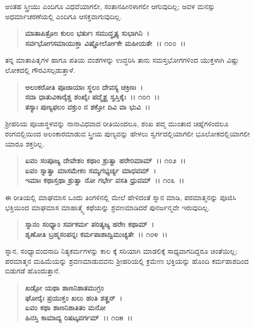 ಅಂತಹ ಸ್ತ್ರೀಯು ಎಂದಿಗೂ ವಿಧವೆಯಾಗಲೀ, ಸಂತಾನಹೀನಳಾಗಲೀ ಆಗುವುದಿಲ್ಲ; ಅವಳ ಮನಸ್ಸು ಅಧರ್ಮಾಚರಣೆಯಲ್ಲಿ ಎಂದಿಗೂ ಆಸಕ್ತವಾಗುವುದಿಲ್ಲ.

\begin{verse}
\textbf{ಮಾತಾಪಿತ್ರೋಃ ಕುಲಂ ಭರ್ತುಃ ಸಮುದ್ಧೃತ್ಯ ಸುಭಾಗಿನಿ~।}\\\textbf{ಸರ್ವಭೋಗಸಮಾಯುಕ್ತಾ ವಿಷ್ಣೋರ್ಲೋಕೇ ಮಹೀಯತೇ~।। ೧೦೦~।।}
\end{verse}

ತನ್ನ ಮಾತಾಪಿತೃಗಳ ಹಾಗೂ ಪತಿಯ ವಂಶಗಳನ್ನು ಉದ್ಧರಿಸಿ ತಾನು ಸಮಸ್ತಭೋಗಗಳಿಂದ ಯುಕ್ತಳಾಗಿ ವಿಷ್ಣು ಲೋಕದಲ್ಲಿ ಗೌರವಿಸಲ್ಪಡುತ್ತಾಳೆ.

\begin{verse}
\textbf{ಅಲಂಕರೋತಿ ಪೂಜಾಯಾಃ ಸ್ಥಲಂ ದೇವಸ್ಯ ಚಕ್ರಿಣಃ~।}\\\textbf{ಸದಾ ಧಾತುವಿಕಾರೈಶ್ಚ ಶಂಖೈಃ ಪದ್ಮೈಶ್ಚ ಸ್ವಸ್ತಿಕೈಃ~।। ೧೦೧~।।}\\\textbf{ತಸ್ಯಾಃ ಪುಣ್ಯಫಲಂ ವಕ್ತುಂ ನ ಶಕ್ತೋ ದಿವಿ ವಾ ಭುವಿ~।।}
\end{verse}

ಶ‍್ರೀಹರಿಯ ಪೂಜಾಸ್ಥಳವನ್ನು ನಾನಾವಿಧವಾದ ರೀತಿಯಿಂದಲೂ, ಶಂಖ ಪದ್ಮ ಮುಂತಾದ ಚಿಹ್ನೆಗಳಿಂದಲೂ ರಂಗವಲ್ಲಿಯಿಂದ ಅಲಂಕಾರಮಾಡುವ ಸ್ತ್ರೀಯ ಪುಣ್ಯವನ್ನು ಹೇಳಲು ಸ್ವರ್ಗದಲ್ಲಿಯಾಗಲೀ ಭೂಲೋಕದಲ್ಲಿಯಾಗಲೀ ಯಾರೂ ಶಕ್ತರಿಲ್ಲ.

\begin{verse}
\textbf{ಏವಂ ಸಂಪೂಜ್ಯ ದೇವೇಶಂ ಕಥಾಂ ಶ್ರುತ್ವಾ ಹರೇರಿಮಾಮ್~।। ೧೦೨~।।}\\\textbf{ಏವಂ ಸ್ನಾತ್ವಾ ಮಾಸಮೇಕಂ ಸಮ್ಯಗಭ್ಯರ್ಚ್ಯ ಮಾಧವಮ್~।}\\\textbf{ಇಮಾಃ ಕಥಾಸ್ತಥಾ ಶ್ರುತ್ವಾ ನೋ ಗರ್ಭೇ ವಸತಿ ಧ್ರುವಮ್~।। ೧೦೩~।।}
\end{verse}

ಈ ರೀತಿಯಲ್ಲಿ ಮಾಘಮಾಸ ಒಂದು ತಿಂಗಳಿನಲ್ಲಿ ಮೇಲೆ ಹೇಳಿದಂತೆ ಸ್ನಾನ ಮಾಡಿ, ಪರಮಾತ್ಮನನ್ನು ಪೂಜಿಸಿ ಭಕ್ತಿಯಿಂದ ಮಾಘಮಾಸ ಮಾಹಾತ್ಮ್ಯೆ ಕಥೆಯನ್ನು ಶ್ರವಣಮಾಡಿದರೆ ಪುನರ್ಜನ್ಮವೇ ಇರುವುದಿಲ್ಲ.

\begin{verse}
\textbf{ಸ್ನಾನಂ ಸಂಧ್ಯಾಂ ಸರ್ವಕರ್ಮ ಪರಿತ್ಯಜ್ಯ ಹರೇಃ ಕಥಾಮ್~।}\\\textbf{ಶೃಣೋತಿ ಬ್ರಹ್ಮಸಂಪನ್ನಃ ಕರ್ಮಪಾಶಾದ್ವಿಮುಚ್ಯತೇ~।। ೧೦೪~।।}
\end{verse}

ಸ್ನಾನ, ಸಂಧ್ಯಾವಂದನಾದಿ ನಿತ್ಯಕರ್ಮಗಳನ್ನು ಕಾಲ ಕ್ಕೆ ಸರಿಯಾಗಿ ಮಾಡಲಿಕ್ಕೆ ಸಾಧ್ಯವಾಗದಿದ್ದರೂ ಚಿಂತೆಯಿಲ್ಲ; ಪರಮಾತ್ಮನ ಮಹಿಮೆಯನ್ನು ಶ್ರವಣಮಾಡುವವನು ಶ‍್ರೀಹರಿಯಲ್ಲಿ ಕ್ರಮೇಣ ಭಕ್ತಿಯನ್ನು ಹೊಂದಿ ಕರ್ಮಪಾಶದಿಂದ ಬಿಡುಗಡೆ ಹೊಂದುತ್ತಾನೆ.

\begin{verse}
\textbf{ಖಡ್ಗೋ ಯಥಾ ಶಾಣನಿಶಾತಮುಗ್ರಂ}\\\textbf{ಘೋರೈಃ ಪ್ರಯುಕ್ತಂ ಖಲು ಹಂತಿ ಶತೄನ್~। }\\\textbf{ಏವಂ ಕಥಾ ಶಾಣನಿಶಾತಿತಂ ಮನೋ} \\\textbf{ಹಿನಸ್ತಿ ಕಾಮಾದ್ಯ ರಿಷಟ್ಕವರ್ಗಮ್~।। ೧೦೫~।।}
\end{verse}

